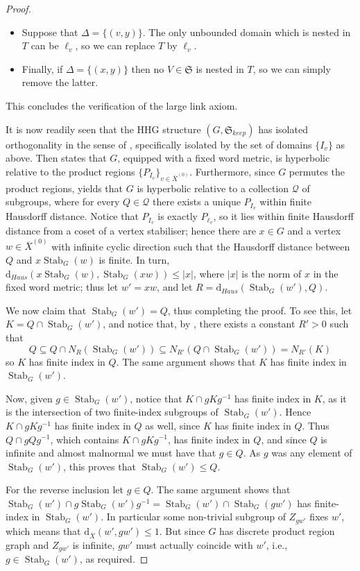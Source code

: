 \documentclass[svgnames]{amsart}
\theoremstyle{plain}
\theoremstyle{definition}
\newcommand{\frakS}{\mathfrak S}
\newcommand{\ov}[1]{\overline{#1}}
\newcommand{\dist}{\mathrm{d}}
\newcommand{\Stab}[2]{\operatorname{Stab}_{#1}(#2)}
\begin{document}
\begin{proof}
\begin{itemize}
        \item Suppose that $\Delta=\{(v,y)\}$. The only unbounded domain which is nested in $T$ can be $\ell_v$, so we can replace $T$ by $\ell_v$.
        \item Finally, if $\Delta=\{(x,y)\}$ then no $V\in \frakS$ is nested in $T$, so we can simply remove the latter.
    \end{itemize}
    This concludes the verification of the large link axiom.
\par\medskip 
It is now readily seen that the HHG structure $(G,\frakS_{keep})$ has isolated orthogonality in the sense of \cite{russell}, specifically isolated by the set of domains $\{I_v\}$ as above. Then \cite[Theorem 4.3]{russell} states that $G$, equipped with a fixed word metric, is hyperbolic relative to the product regions $\{P_{I_v}\}_{v\in \ov X^{(0)}}$. Furthermore, since $G$ permutes the product regions, \cite[Proposition 5.1]{drutu_relhyp} yields that $G$ is hyperbolic  relative to a collection $\mathcal{Q}$ of subgroups, where for every $Q\in \mathcal Q$ there exists a unique $P_{I_v}$ within finite Hausdorff distance. Notice that $P_{I_v}$ is exactly $P_{\ell_v}$, so it lies within finite Hausdorff distance from a coset of a vertex stabiliser; hence there are $x\in G$ and a vertex $w\in \ov X^{(0)}$ with infinite cyclic direction such that the Hausdorff distance between $Q$ and $x\Stab{G}{w}$ is finite. In turn, $\dist_{Haus}(x\Stab{G}{w},\Stab{G}{xw})\le |x|$, where $|x|$ is the norm of $x$ in the fixed word metric; thus let $w'=xw$, and let $R=\dist_{Haus}(\Stab{G}{w'},Q)$.

We now claim that $\Stab{G}{w'}=Q$, thus completing the proof. To see this, let $K=Q\cap \Stab{G}{w'}$, and notice that, by \cite[Lemma 4.5]{Hruska_Wise}, there exists a constant $R'>0$ such that
$$Q\subseteq Q\cap N_R(\Stab{G}{w'})\subseteq N_{R'}(Q\cap \Stab{G}{w'})=N_{R'}(K)$$
so $K$ has finite index in $Q$. The same argument shows that $K$ has finite index in $\Stab{G}{w'}$.

Now, given $g\in \Stab{G}{w'}$, notice that $K\cap gKg^{-1}$ has finite index in $K$, as it is the intersection of two finite-index subgroups of $\Stab{G}{w'}$. Hence $K\cap gKg^{-1}$ has finite index in $Q$ as well, since $K$ has finite index in $Q$. Thus $Q\cap gQg^{-1}$, which contains $K\cap gKg^{-1}$, has finite index in $Q$, and since $Q$ is infinite and almost malnormal we must have that $g\in Q$. As $g$ was any element of $\Stab{G}{w'}$, this proves that $\Stab{G}{w'}\le Q$. 

For the reverse inclusion let $g\in Q$. The same argument shows that $\Stab{G}{w'}\cap g\Stab{G}{w'}g^{-1}=\Stab{G}{w'}\cap \Stab{G}{gw'}$ has finite-index in $\Stab{G}{w'}$. In particular some non-trivial subgroup of $Z_{gw'}$ fixes $w'$, which means that $\dist_{\ov X}(w',gw')\le 1$. But since $G$ has discrete product region graph and $Z_{gw'}$ is infinite, $gw'$ must actually coincide with $w'$, i.e., $g\in \Stab{G}{w'}$, as required. 
\end{proof}
\end{document}
